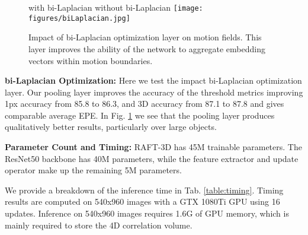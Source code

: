 \documentclass[final]{cvpr}
\begin{document}
\begin{figure}
    \centering
    \small with bi-Laplacian \hspace{10mm} without bi-Laplacian
    \texttt{[image: figures/biLaplacian.jpg]}
    \caption{Impact of bi-Laplacian optimization layer on motion fields. This layer improves the ability of the network to aggregate embedding vectors within motion boundaries.}
    \label{fig:gbap}
    \vspace{-4mm}
\end{figure}

\vspace{1mm} \noindent \textbf{bi-Laplacian Optimization:} Here we test the impact bi-Laplacian optimization layer. Our pooling layer improves the accuracy of the threshold metrics improving 1px accuracy from 85.8 to 86.3, and 3D accuracy from 87.1 to 87.8 and gives comparable average EPE. In Fig. \ref{fig:gbap} we see that the pooling layer produces qualitatively better results, particularly over large objects.

\vspace{1mm}
\noindent \textbf{Parameter Count and Timing: } RAFT-3D has 45M trainable parameters. The ResNet50 backbone has 40M parameters, while the feature extractor and update operator make up the remaining 5M parameters. 

We provide a breakdown of the inference time in Tab. \ref{table:timing}. Timing results are computed on 540x960 images with a GTX 1080Ti GPU using 16 updates. Inference on 540x960 images requires 1.6G of GPU memory, which is mainly required to store the 4D correlation volume.


\begin{table}[h]
\centering
{}
\caption{Forward pass timing for different components.}
\label{table:timing}
\end{table}
\end{document}
